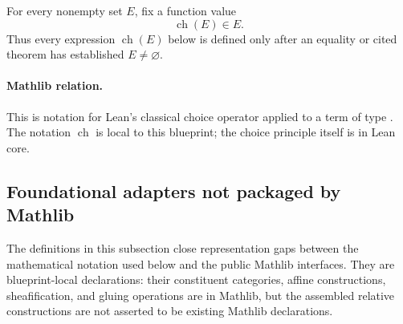 \begin{definition}
  \label{def:nagata-choice-notation}

  For every nonempty set $E$, fix a function value
  \[
    \operatorname{ch}(E)\in E.                                    \tag{C0}
  \]
  Thus every expression $\operatorname{ch}(E)$ below is defined only after
  an equality or cited theorem has established $E\neq\varnothing$.

  \paragraph{Mathlib relation.}
  This is notation for Lean's classical choice operator
  \texttt{} applied to a term of type
  \texttt{}.  The notation $\operatorname{ch}$ is
  local to this blueprint; the choice principle itself is in Lean core.
\end{definition}

\subsection{Foundational adapters not packaged by Mathlib}

The definitions in this subsection close representation gaps between the
mathematical notation used below and the public Mathlib interfaces.  They are
blueprint-local declarations: their constituent categories, affine
constructions, sheafification, and gluing operations are in Mathlib, but the
assembled relative constructions are not asserted to be existing Mathlib
declarations.

